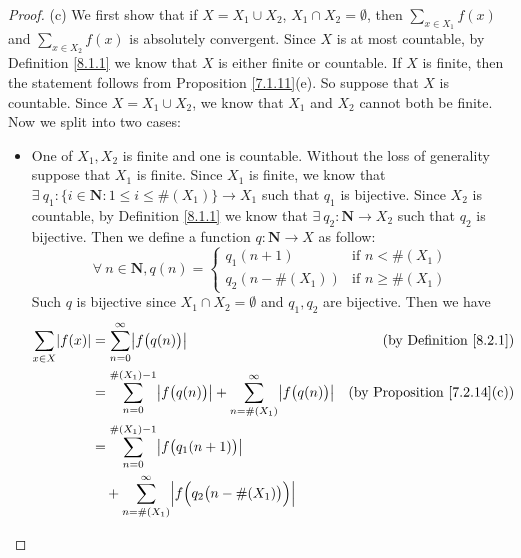\begin{proof}{(c)}
    We first show that if \(X = X_1 \cup X_2\), \(X_1 \cap X_2 = \emptyset\), then \(\sum_{x \in X_1} f(x)\) and \(\sum_{x \in X_2} f(x)\) is absolutely convergent.
    Since \(X\) is at most countable, by Definition \ref{8.1.1} we know that \(X\) is either finite or countable.
    If \(X\) is finite, then the statement follows from Proposition \ref{7.1.11}(e).
    So suppose that \(X\) is countable.
    Since \(X = X_1 \cup X_2\), we know that \(X_1\) and \(X_2\) cannot both be finite.
    Now we split into two cases:
    \begin{itemize}
        \item One of \(X_1, X_2\) is finite and one is countable.
              Without the loss of generality suppose that \(X_1\) is finite.
              Since \(X_1\) is finite, we know that \(\exists\ q_1 : \{i \in \mathbf{N} : 1 \leq i \leq \#(X_1)\} \to X_1\) such that \(q_1\) is bijective.
              Since \(X_2\) is countable, by Definition \ref{8.1.1} we know that \(\exists\ q_2 : \mathbf{N} \to X_2\) such that \(q_2\) is bijective.
              Then we define a function \(q : \mathbf{N} \to X\) as follow:
              \[
                  \forall\ n \in \mathbf{N}, q(n) = \begin{cases}
                      q_1(n + 1)       & \text{if } n < \#(X_1)    \\
                      q_2(n - \#(X_1)) & \text{if } n \geq \#(X_1)
                  \end{cases}
              \]
              Such \(q\) is bijective since \(X_1 \cap X_2 = \emptyset\) and \(q_1, q_2\) are bijective.
              Then we have
              \begin{align*}
                  \sum_{x \in X} \abs*{f(x)} & = \sum_{n = 0}^\infty \abs*{f\big(q(n)\big)}                                                           & \text{(by Definition \ref{8.2.1})}      \\
                                             & = \sum_{n = 0}^{\#(X_1) - 1} \abs*{f\big(q(n)\big)} + \sum_{n = \#(X_1)}^\infty \abs*{f\big(q(n)\big)} & \text{(by Proposition \ref{7.2.14}(c))} \\
                                             & = \sum_{n = 0}^{\#(X_1) - 1} \abs*{f\big(q_1(n + 1)\big)}                                                                                        \\
                                             & \quad + \sum_{n = \#(X_1)}^\infty \abs*{f\Big(q_2\big(n - \#(X_1)\big)\Big)}                                                                     \\

\end{align*}
\end{itemize}
\end{proof}
